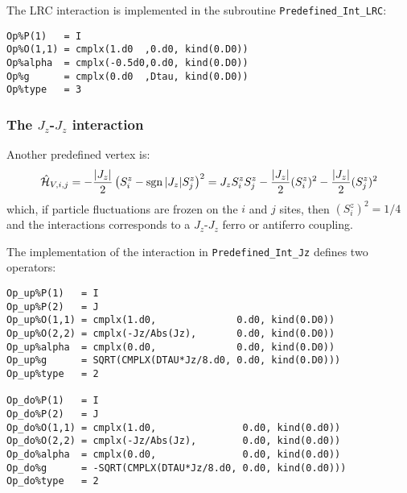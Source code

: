 The LRC interaction is implemented in the subroutine \texttt{Predefined\_Int\_LRC}:
\begin{lstlisting}[style=fortran]
Op%P(1)   = I
Op%O(1,1) = cmplx(1.d0  ,0.d0, kind(0.D0))
Op%alpha  = cmplx(-0.5d0,0.d0, kind(0.D0))
Op%g      = cmplx(0.d0  ,Dtau, kind(0.D0)) 
Op%type   = 3

\end{lstlisting}


\subsubsection{The $J_z$-$J_z$ interaction}

Another predefined vertex is:
\begin{align}
\hat{\mathcal{H}}_{V,i,j} =
- \frac{|J_z|}{2}  \left( S^{z}_i - \operatorname{sgn}|J_z| S^{z}_j \right)^2 =
J_z  S^{z}_i  S^{z}_j  - \frac{|J_z|}{2} (S^{z}_i)^2 - \frac{|J_z|}{2}(S^{z}_j)^2 
\end{align} 
which, if particle fluctuations are frozen on the $i$ and $j$ sites, then $(S^{z}_i)^2 = 1/4$ and the interactions corresponds to a $J_z$-$J_z$ ferro or antiferro coupling.

The implementation of the interaction in \texttt{Predefined\_Int\_Jz} defines two operators:
\begin{lstlisting}[style=fortran]
Op_up%P(1)   = I
Op_up%P(2)   = J
Op_up%O(1,1) = cmplx(1.d0,              0.d0, kind(0.D0))
Op_up%O(2,2) = cmplx(-Jz/Abs(Jz),       0.d0, kind(0.D0))
Op_up%alpha  = cmplx(0.d0,              0.d0, kind(0.D0))
Op_up%g      = SQRT(CMPLX(DTAU*Jz/8.d0, 0.d0, kind(0.D0))) 
Op_up%type   = 2

Op_do%P(1)   = I
Op_do%P(2)   = J
Op_do%O(1,1) = cmplx(1.d0,               0.d0, kind(0.d0))
Op_do%O(2,2) = cmplx(-Jz/Abs(Jz),        0.d0, kind(0.d0))
Op_do%alpha  = cmplx(0.d0,               0.d0, kind(0.d0))
Op_do%g      = -SQRT(CMPLX(DTAU*Jz/8.d0, 0.d0, kind(0.d0))) 
Op_do%type   = 2

\end{lstlisting}
